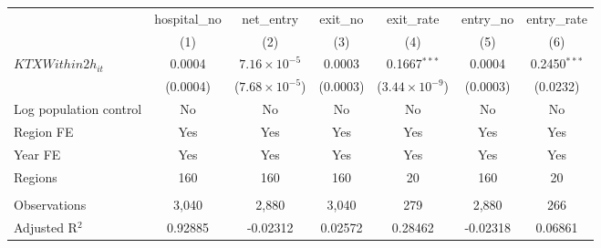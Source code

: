 \begingroup
\centering
\begin{tabular}{lcccccc}
   \toprule
                          & hospital\_no  & net\_entry              & exit\_no  & exit\_rate              & entry\_no  & entry\_rate \\    
                          & (1)           & (2)                     & (3)       & (4)                     & (5)        & (6)\\  
   \midrule 
   $KTXWithin2h_{it}$     & 0.0004        & $7.16\times 10^{-5}$    & 0.0003    & 0.1667$^{***}$          & 0.0004     & 0.2450$^{***}$\\   
                          & (0.0004)      & ($7.68\times 10^{-5}$)  & (0.0003)  & ($3.44\times 10^{-9}$)  & (0.0003)   & (0.0232)\\   
   Log population control & No            & No                      & No        & No                      & No         & No\\  
   Region FE              & Yes           & Yes                     & Yes       & Yes                     & Yes        & Yes\\  
   Year FE                & Yes           & Yes                     & Yes       & Yes                     & Yes        & Yes\\  
   Regions                & 160           & 160                     & 160       & 20                      & 160        & 20\\  
    \\
   Observations           & 3,040         & 2,880                   & 3,040     & 279                     & 2,880      & 266\\  
   Adjusted R$^2$         & 0.92885       & -0.02312                & 0.02572   & 0.28462                 & -0.02318   & 0.06861\\  
   \bottomrule
\end{tabular}
\par\endgroup
